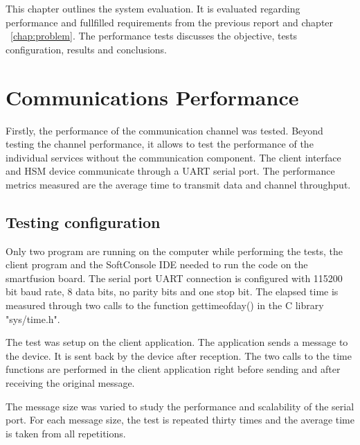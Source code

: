 \cleardoublepage
\label{chap:evaluation}

This chapter outlines the system evaluation. It is evaluated regarding performance and fullfilled requirements from the previous report and chapter ~\ref{chap:problem}.
The performance tests discusses the objective, tests configuration, results and conclusions.
\section{Communications Performance}\label{chap:evaluation:comms}

Firstly, the performance of the communication channel was tested. Beyond testing the channel performance, it allows to test the performance of the individual services without the communication component. 
The client interface and HSM device communicate through a \ac{UART} serial port.
The performance metrics measured are the average time to transmit data and channel throughput.

\subsection{Testing configuration}\label{chap:evaluation:comms:config}

Only two program are running on the computer while performing the tests, the client program and the SoftConsole IDE needed to run the code on the smartfusion board.
The serial port UART connection is configured with 115200 bit baud rate, 8 data bits, no parity bits and one stop bit.
The elapsed time is measured through two calls to the function gettimeofday() in the C library "sys/time.h".

The test was setup on the client application. The application sends a message to the device. It is sent back by the device after reception. The two calls to the time functions are performed in the client application right before sending and after receiving the original message.

The message size was varied to study the performance and scalability of the serial port. For each message size, the test is repeated thirty times and the average time is taken from all repetitions.

